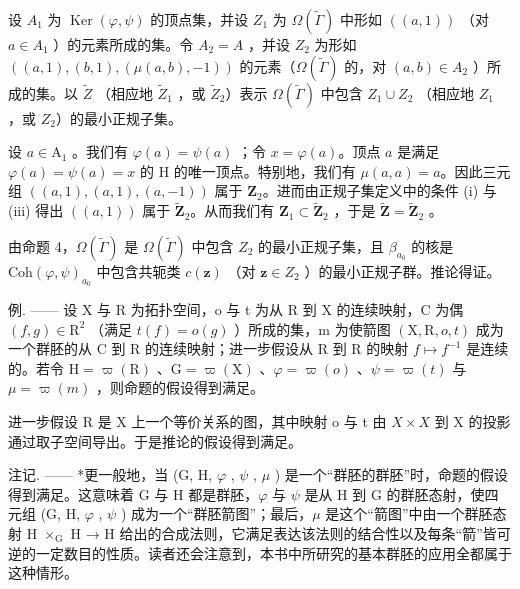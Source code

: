 设 \(A_{1}\) 为 \(\operatorname{Ker}(\varphi,\psi)\) 的顶点集，并设 \(Z_{1}\) 为 \(\Omega(\widetilde{\Gamma})\) 中形如 \(((a,1))\) （对 \(a\in A_{1}\) ）的元素所成的集。令 \(A_{2}=A\) ，并设 \(Z_{2}\) 为形如 \(((a,1),(b,1),(\mu(a,b),-1))\) 的元素（\(\Omega(\widetilde{\Gamma})\) 的，对 \((a,b)\in A_{2}\) ）所成的集。以 \(\widetilde{Z}\) （相应地 \(\widetilde{Z}_{1}\) ，或 \(\widetilde{Z}_{2}\)）表示 \(\Omega(\widetilde{\Gamma})\) 中包含 \(Z_{1}\cup Z_{2}\) （相应地 \(Z_{1}\) ，或 \(Z_{2}\)）的最小正规子集。

设 \(a \in \mathrm{A}_1\) 。我们有 \(\varphi(a) = \psi(a)\) ；令 \(x = \varphi(a)\)。顶点 \(a\) 是满足 \(\varphi(a) = \psi(a) = x\) 的 H 的唯一顶点。特别地，我们有 \(\mu(a, a) = a\)。因此三元组 \(((a, 1), (a, 1), (a, -1))\) 属于 \(\mathbf{Z}_2\)。进而由正规子集定义中的条件 (i) 与 (iii) 得出 \(((a, 1))\) 属于 \(\widetilde{\mathbf{Z}}_2\)。从而我们有 \(\mathbf{Z}_1 \subset \widetilde{\mathbf{Z}}_2\) ，于是 \(\widetilde{\mathbf{Z}} = \widetilde{\mathbf{Z}}_2\) 。

由命题 4，\(\Omega(\tilde{\Gamma})\) 是 \(\Omega(\tilde{\Gamma})\) 中包含 \(Z_{2}\) 的最小正规子集，且 \(\beta_{a_{0}}\) 的核是 \(\mathrm{Coh}(\varphi,\psi)_{a_{0}}\) 中包含共轭类 \(c(\mathbf{z})\) （对 \(\mathbf{z}\in Z_{2}\) ）的最小正规子群。推论得证。

例. —— 设 X 与 R 为拓扑空间，o 与 t 为从 R 到 X 的连续映射，C 为偶 \((f,g)\in\mathrm{R}^{2}\) （满足 \(t(f)=o(g)\) ）所成的集，m 为使箭图 \((\mathrm{X},\mathrm{R},o,t)\) 成为一个群胚的从 C 到 R 的连续映射；进一步假设从 R 到 R 的映射 \(f\mapsto f^{-1}\) 是连续的。若令 \(\mathrm{H}=\varpi(\mathrm{R})\) 、\(\mathrm{G}=\varpi(\mathrm{X})\) 、\(\varphi=\varpi(o)\) 、\(\psi=\varpi(t)\) 与 \(\mu=\varpi(m)\) ，则命题的假设得到满足。

进一步假设 R 是 X 上一个等价关系的图，其中映射 o 与 t 由 \(X \times X\) 到 X 的投影通过取子空间导出。于是推论的假设得到满足。

注记. —— *更一般地，当 (G, H, \(\varphi\) , \(\psi\) , \(\mu\) ) 是一个“群胚的群胚”时，命题的假设得到满足。这意味着 G 与 H 都是群胚，\(\varphi\) 与 \(\psi\) 是从 H 到 G 的群胚态射，使四元组 (G, H, \(\varphi\) , \(\psi\) ) 成为一个“群胚箭图”；最后，\(\mu\) 是这个“箭图”中由一个群胚态射 H \(\times_{\mathrm{G}}\) H → H 给出的合成法则，它满足表达该法则的结合性以及每条“箭”皆可逆的一定数目的性质。读者还会注意到，本书中所研究的基本群胚的应用全都属于这种情形。

